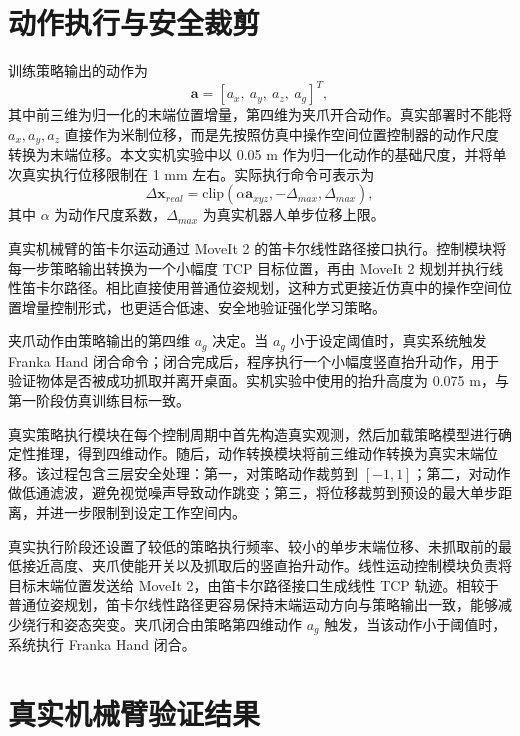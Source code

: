 \documentclass[
    type = bachelor,
    oneside,
    fontset = fandol
]{njuthesis}
\begin{document}
\section{动作执行与安全裁剪}

训练策略输出的动作为
\begin{equation}
  \boldsymbol{a}=[a_x,\ a_y,\ a_z,\ a_g]^T,
\end{equation}
其中前三维为归一化的末端位置增量，第四维为夹爪开合动作。真实部署时不能将 $a_x,a_y,a_z$ 直接作为米制位移，而是先按照仿真中操作空间位置控制器的动作尺度转换为末端位移。本文实机实验中以 0.05 m 作为归一化动作的基础尺度，并将单次真实执行位移限制在 1 mm 左右。实际执行命令可表示为
\begin{equation}
  \Delta \boldsymbol{x}_{real}
  = \mathrm{clip}(\alpha \boldsymbol{a}_{xyz}, -\Delta_{max}, \Delta_{max}),
\end{equation}
其中 $\alpha$ 为动作尺度系数，$\Delta_{max}$ 为真实机器人单步位移上限。

真实机械臂的笛卡尔运动通过 MoveIt 2 的笛卡尔线性路径接口执行。控制模块将每一步策略输出转换为一个小幅度 TCP 目标位置，再由 MoveIt 2 规划并执行线性笛卡尔路径。相比直接使用普通位姿规划，这种方式更接近仿真中的操作空间位置增量控制形式，也更适合低速、安全地验证强化学习策略。

夹爪动作由策略输出的第四维 $a_g$ 决定。当 $a_g$ 小于设定阈值时，真实系统触发 Franka Hand 闭合命令；闭合完成后，程序执行一个小幅度竖直抬升动作，用于验证物体是否被成功抓取并离开桌面。实机实验中使用的抬升高度为 0.075 m，与第一阶段仿真训练目标一致。

真实策略执行模块在每个控制周期中首先构造真实观测，然后加载策略模型进行确定性推理，得到四维动作。随后，动作转换模块将前三维动作转换为真实末端位移。该过程包含三层安全处理：第一，对策略动作裁剪到 $[-1,1]$；第二，对动作做低通滤波，避免视觉噪声导致动作跳变；第三，将位移裁剪到预设的最大单步距离，并进一步限制到设定工作空间内。

真实执行阶段还设置了较低的策略执行频率、较小的单步末端位移、未抓取前的最低接近高度、夹爪使能开关以及抓取后的竖直抬升动作。线性运动控制模块负责将目标末端位置发送给 MoveIt 2，由笛卡尔路径接口生成线性 TCP 轨迹。相较于普通位姿规划，笛卡尔线性路径更容易保持末端运动方向与策略输出一致，能够减少绕行和姿态突变。夹爪闭合由策略第四维动作 $a_g$ 触发，当该动作小于阈值时，系统执行 Franka Hand 闭合。


\section{真实机械臂验证结果}
\end{document}
